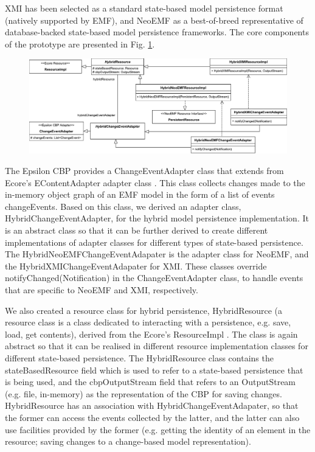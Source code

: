 XMI has been selected as a standard state-based model persistence format (natively supported by EMF), and NeoEMF as a best-of-breed representative of database-backed state-based model persistence frameworks. The core components of the prototype are presented in Fig. \ref{fig:class_diagram}. 

\vspace{-15pt}
\begin{figure}[ht]
    \includegraphics[width=\linewidth]{images/class_diagram}
    \label{fig:class_diagram}
\end{figure}

\vspace{-15pt}
The Epsilon CBP provides a \textsf{ChangeEventAdapter} class \cite{DBLP:conf/models/YohannisKP17} that extends from Ecore's \textsf{EContentAdapter} adapter class%
. This class collects changes made to the in-memory object graph of an EMF model in the form of a list of events \textsf{changeEvents}. Based on this class, we derived an adapter class, \textsf{HybridChangeEventAdapter}, for the hybrid model persistence implementation. It is an abstract class so that it can be further derived to create different implementations of adapter classes for different types of state-based persistence. The \textsf{HybridNeoEMFChangeEventAdapater} is the adapter class for NeoEMF, and the \textsf{HybridXMIChangeEventAdapater} for XMI. These classes override \textsf{notifyChanged}(\textsf{Notification}) in the \textsf{ChangeEventAdapter} class, to handle events that are specific to NeoEMF and XMI, respectively.

We also created a resource class for hybrid persistence, \textsf{HybridResource} (a resource class is a class dedicated to interacting with a persistence, e.g. save, load, get contents), derived from the Ecore's \textsf{ResourceImpl}%
. The class is again abstract so that it can be realised in different resource implementation classes for different state-based persistence. The \textsf{HybridResource} class contains the \textsf{stateBasedResource} field which is used to refer to a state-based persistence that is being used, and the \textsf{cbpOutputStream} field that refers to an \textsf{OutputStream} (e.g. file, in-memory) as the representation of the CBP for saving changes. \textsf{HybridResource} has an association with \textsf{HybridChangeEventAdapater}, so that the former can access the events collected by the latter, and the latter can also use facilities provided by the former (e.g. getting the identity of an element in the resource; saving changes to a change-based model representation).

